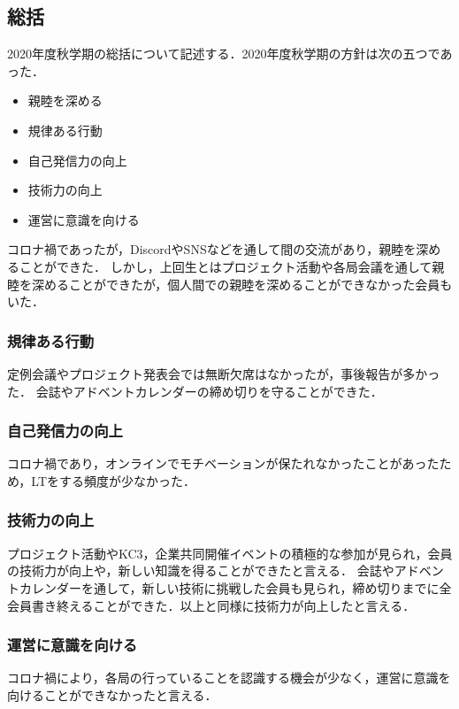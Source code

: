 \subsection*{\firstGrade{}総括}


2020年度秋学期の\firstGrade{}総括について記述する．2020年度秋学期の\firstGrade{}方針は次の五つであった．
\begin{itemize}
	\item 親睦を深める
	\item 規律ある行動
	\item 自己発信力の向上
	\item 技術力の向上
	\item 運営に意識を向ける
\end{itemize}

コロナ禍であったが，DiscordやSNSなどを通して\firstGrade{}間の交流があり，親睦を深めることができた．
しかし，上回生とはプロジェクト活動や各局会議を通して親睦を深めることができたが，個人間での親睦を深めることができなかった会員もいた．

\subsubsection*{規律ある行動}
定例会議やプロジェクト発表会では無断欠席はなかったが，事後報告が多かった．
会誌やアドベントカレンダーの締め切りを守ることができた．

\subsubsection*{自己発信力の向上}
コロナ禍であり，オンラインでモチベーションが保たれなかったことがあったため，LTをする頻度が少なかった．

\subsubsection*{技術力の向上}
プロジェクト活動やKC3，企業共同開催イベントの積極的な参加が見られ，\firstGrade{}会員の技術力が向上や，新しい知識を得ることができたと言える．
会誌やアドベントカレンダーを通して，新しい技術に挑戦した会員も見られ，締め切りまでに全会員書き終えることができた．以上と同様に技術力が向上したと言える．

\subsubsection*{運営に意識を向ける}
コロナ禍により，各局の行っていることを認識する機会が少なく，運営に意識を向けることができなかったと言える．



